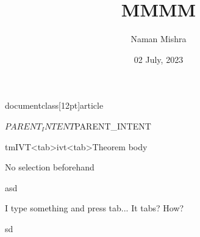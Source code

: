 documentclass[12pt]{article}


\title{MMMM}
\author{Naman Mishra}
\date{02 July, 2023}


\maketitle




\begin{yayyy}
    \begin{}
        \begin{}
    $PARENT_INTENT      
    $PARENT_INTENT  \end{}
    \end{}
\end{yayyy}
tmIVT<tab>ivt<tab>Theorem body

\begin{interesting}
    \begin{}
       
    \end{}
\end{interesting}
\begin{meow}
    No selection beforehand
\end{meow}
\begin{}
    asd
\end{}
\begin{empty}
    I type something and press tab...   It tabs?
    How?
\end{empty}
\begin{meow}
    \begin{empty}
        
    \end{empty}
\end{meow}
\begin{}
    \begin{meow}
            sd
    \end{meow}
\end{}

